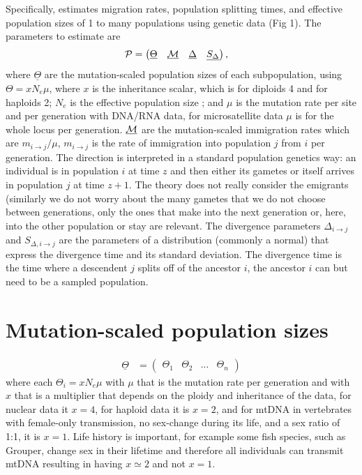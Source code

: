 Specifically, \migrate estimates migration rates, population splitting times, and effective population sizes of 1 to many populations
using genetic data (Fig 1).  The parameters to estimate are
\begin{align}
\label{PARAMETERS}
\mathcal{P} &= \left(\begin{matrix}  \underline{\Theta} & \underline{\mathcal{M}} & \underline{\Delta} & \underline{S_\Delta}\end{matrix}\right),
\end{align}
where $ \underline{\Theta}$ are the mutation-scaled population sizes of each subpopulation, using $\Theta=xN_e\mu$, where $x$ is the inheritance scalar, which is for diploids 4 and for haploids 2; $N_e$ is the effective population size ; and $\mu$ is the mutation rate per site and per generation with DNA/RNA data, for microsatellite data $\mu$ is for the whole locus per generation. $ \underline{\mathcal{M}}$ are the mutation-scaled immigration rates which are $m_{i\rightarrow j} / \mu$, $m_{i\rightarrow j}$ is the rate of immigration into population $j$ from $i$ per generation. The direction is interpreted in a standard population genetics way: an individual is in population $i$ at time $z$ and then either its gametes or itself arrives in population $j$ at time $z+1$. The theory does not really consider the emigrants (similarly we do not worry about the many gametes that we do not choose between generations, only the ones that make into the next generation or, here, into the other population or stay are relevant. The divergence parameters $\Delta_{i\rightarrow j}$ and $S_{\Delta, i\rightarrow j}$ are the parameters of a distribution (commonly a normal) that express the divergence time and its standard deviation. The divergence time is the time where a descendent $j$ splits off of the ancestor $i$, the ancestor $i$ can but need to be a sampled population.  
\section*{Mutation-scaled population sizes}
\vskip -1cm 
\begin{align}
\underline{\Theta} &= \left( \begin{matrix} \Theta_1 & \Theta_2 & ... & \Theta_n \end{matrix} \right)
\end{align}
where each $\Theta_i = x N_e \mu$ with $\mu$ that is the mutation rate per generation and with $x$ that is a multiplier that depends on the ploidy and inheritance of the data, for nuclear data it $x=4$, for haploid data it is $x=2$, and for mtDNA in vertebrates with female-only transmission, no sex-change during its life, and a sex ratio of 1:1, it is $x=1$. Life history is important, for example some fish species, such as Grouper, change sex in their lifetime and therefore all individuals can transmit mtDNA resulting in having $x\simeq2$ and not $x=1$. 


